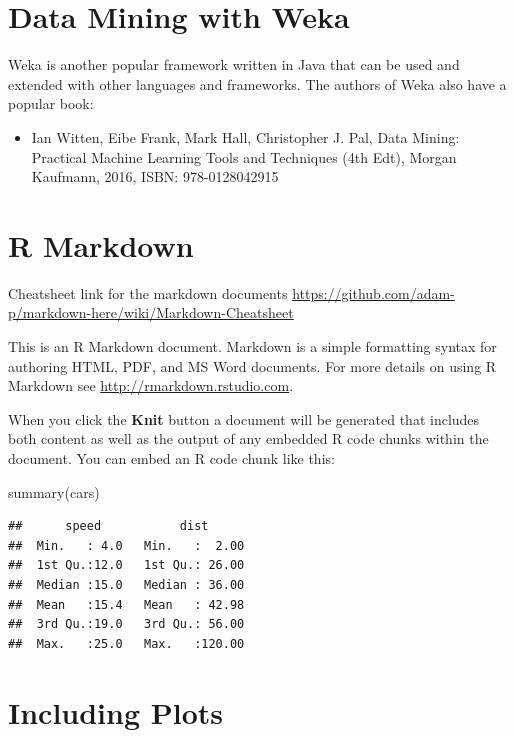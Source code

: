 \documentclass[
]{book}
\newenvironment{Shaded}{\begin{snugshade}}{\end{snugshade}}
\newcommand{\FunctionTok}[1]{\textcolor[rgb]{0.00,0.00,0.00}{#1}}
\newcommand{\NormalTok}[1]{#1}
\providecommand{\tightlist}{%
  \setlength{\itemsep}{0pt}\setlength{\parskip}{0pt}}
\begin{document}
\hypertarget{data-mining-with-weka}{%
\section{Data Mining with Weka}\label{data-mining-with-weka}}

Weka is another popular framework written in Java that can be used and extended with other languages and frameworks. The authors of Weka also have a popular book:

\begin{itemize}
\tightlist
\item
  Ian Witten, Eibe Frank, Mark Hall, Christopher J. Pal, Data Mining: Practical Machine Learning Tools and Techniques (4th Edt), Morgan Kaufmann, 2016, ISBN: 978-0128042915
\end{itemize}

\hypertarget{r-markdown}{%
\section{R Markdown}\label{r-markdown}}

Cheatsheet link for the markdown documents
\url{https://github.com/adam-p/markdown-here/wiki/Markdown-Cheatsheet}

This is an R Markdown document. Markdown is a simple formatting syntax for authoring HTML, PDF, and MS Word documents. For more details on using R Markdown see \url{http://rmarkdown.rstudio.com}.

When you click the \textbf{Knit} button a document will be generated that includes both content as well as the output of any embedded R code chunks within the document. You can embed an R code chunk like this:

\begin{Shaded}
\begin{Highlighting}[]
\FunctionTok{summary}\NormalTok{(cars)}
\end{Highlighting}
\end{Shaded}

\begin{verbatim}
##      speed           dist       
##  Min.   : 4.0   Min.   :  2.00  
##  1st Qu.:12.0   1st Qu.: 26.00  
##  Median :15.0   Median : 36.00  
##  Mean   :15.4   Mean   : 42.98  
##  3rd Qu.:19.0   3rd Qu.: 56.00  
##  Max.   :25.0   Max.   :120.00
\end{verbatim}

\hypertarget{including-plots}{%
\section{Including Plots}\label{including-plots}}
\end{document}
